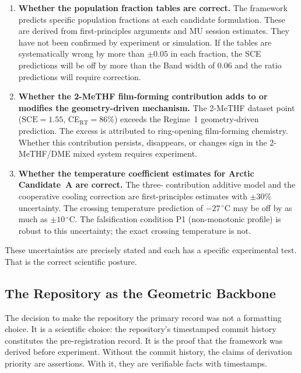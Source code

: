 \documentclass[11pt]{article}
\theoremstyle{plain}
\theoremstyle{definition}
\theoremstyle{remark}
\begin{document}
\begin{enumerate}[leftmargin=2em]
  \item \textbf{Whether the population fraction tables are correct.}
        The framework predicts specific population fractions at
        each candidate formulation.  These are derived from
        first-principles arguments and MU session estimates.
        They have not been confirmed by experiment or simulation.
        If the tables are systematically wrong by more than
        $\pm 0.05$ in each fraction, the SCE predictions will
        be off by more than the Band width of $0.06$ and the
        ratio predictions will require correction.

  \item \textbf{Whether the 2-MeTHF film-forming contribution
        adds to or modifies the geometry-driven mechanism.}
        The 2-MeTHF dataset point ($\mathrm{SCE} = 1.55$,
        CE$_\mathrm{RT} = 86\%$) exceeds the Regime~1
        geometry-driven prediction.  The excess is attributed
        to ring-opening film-forming chemistry.  Whether this
        contribution persists, disappears, or changes sign
        in the 2-MeTHF/DME mixed system requires experiment.

  \item \textbf{Whether the temperature coefficient estimates
        for Arctic Candidate~A are correct.}  The three-
        contribution additive model and the cooperative
        cooling correction are first-principles estimates
        with $\pm 30\%$ uncertainty.  The crossing temperature
        prediction of $-27\,^\circ$C may be off by as much as
        $\pm 10\,^\circ$C.  The falsification condition P1
        (non-monotonic profile) is robust to this uncertainty;
        the exact crossing temperature is not.
\end{enumerate}

These uncertainties are precisely stated and each has a specific
experimental test.  That is the correct scientific posture.

\subsection{The Repository as the Geometric Backbone}

The decision to make the repository the primary record was not
a formatting choice.  It is a scientific choice: the repository's
timestamped commit history constitutes the pre-registration record.
It is the proof that the framework was derived before experiment.
Without the commit history, the claims of derivation priority are
assertions.  With it, they are verifiable facts with timestamps.
\end{document}
